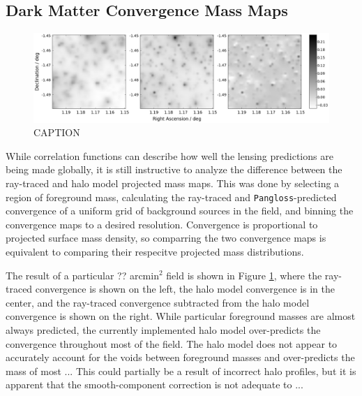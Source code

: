 \documentclass[%
 reprint,
 amsmath,amssymb,
 aps,nofootinbib
]{revtex4-1}
\begin{document}


\subsection{Dark Matter Convergence Mass Maps}

\begin{figure}
    \centering
    \includegraphics[width=\textwidth]{figs-swe/thesis/kappamaps.png}
    \captionsetup{justification=raggedright,singlelinecheck=false}
    \caption{CAPTION}
    \label{fig:kappamaps}
\end{figure}
%

While correlation functions can describe how well the lensing predictions are being made globally, it is still instructive to analyze the difference between the ray-traced and halo model projected mass maps. This was done by selecting a region of foreground mass, calculating the ray-traced and \texttt{Pangloss}-predicted convergence of a uniform grid of background sources in the field, and binning the convergence maps to a desired resolution. Convergence is proportional to projected surface mass density, so comparring the two convergence maps is equivalent to comparing their respecitve projected mass distributions.

The result of a particular ?? arcmin$^2$ field is shown in Figure \ref{fig:kappamaps}, where the ray-traced convergence is shown on the left, the halo model convergence is in the center, and the ray-traced convergence subtracted from the halo model convergence is shown on the right. While particular foreground masses are almost always predicted, the currently implemented halo model over-predicts the convergence throughout most of the field. The halo model does not appear to accurately account for the voids between foreground masses and over-predicts the mass of most ... This could partially be a result of incorrect halo profiles, but it is apparent that the smooth-component correction is not adequate to ...
\end{document}
